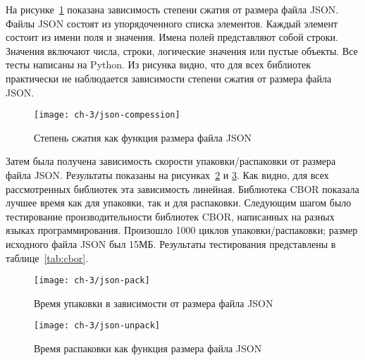 На рисунке~\cref{fig:json-compress} показана зависимость степени сжатия от размера файла JSON. Файлы JSON состоят из упорядоченного списка элементов. Каждый элемент состоит из имени поля и значения. Имена полей представляют собой строки. Значения включают числа, строки, логические значения или пустые объекты. Все тесты написаны на Python. Из рисунка видно, что для всех библиотек практически не наблюдается зависимости степени сжатия от размера файла JSON.

\begin{figure}[!htb]
	\centering
	\texttt{[image: ch-3/json-compession]}
	\caption{Степень сжатия как функция размера файла JSON}
	\label{fig:json-compress}
\end{figure}


Затем была получена зависимость скорости упаковки/распаковки от размера файла JSON. Результаты показаны на рисунках~\cref{fig:json-pack} и \cref{fig:json-unpack}. Как видно, для всех рассмотренных библиотек эта зависимость линейная. Библиотека CBOR показала лучшее время как для упаковки, так и для распаковки.
Следующим шагом было тестирование производительности библиотек CBOR, написанных на разных языках программирования. Произошло 1000 циклов упаковки/распаковки; размер исходного файла JSON был 15\:МБ. Результаты тестирования представлены в таблице~\cref{tab:cbor}.

\begin{figure}[!ht]
	\centering
	\texttt{[image: ch-3/json-pack]}
	\caption{Время упаковки в зависимости от размера файла JSON}
	\label{fig:json-pack}
\end{figure}

\begin{figure}[!ht]
	\centering
	\texttt{[image: ch-3/json-unpack]}
	\caption{Время распаковки как функция размера файла JSON}
	\label{fig:json-unpack}
\end{figure}

